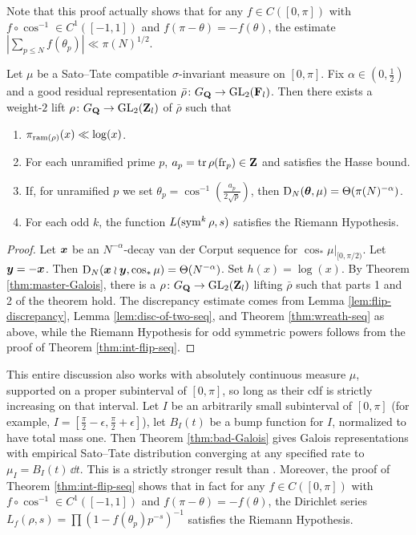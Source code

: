 Note that this proof actually shows that for any $f\in C([0,\pi])$ with 
$f\circ \cos^{-1}\in C^1([-1,1])$ and $f(\pi-\theta) = -f(\theta)$, the 
estimate $\left| \sum_{p\leqslant N} f(\theta_p)\right| \ll \pi(N)^{1/2}$. 

\begin{theorem}\label{thm:bad-Galois}
Let $\mu$ be a Sato--Tate compatible $\sigma$-invariant measure on $[0,\pi]$. 
Fix $\alpha\in \left(0,\frac 1 2\right)$ and a good residual representation 
$\bar\rho\colon G_{\mathbf{Q}} \to \operatorname{GL}_2(\mathbf{F}_l)$. Then there exists a weight-$2$ lift 
$\rho\colon G_{\mathbf{Q}} \to \operatorname{GL}_2(\mathbf{Z}_l)$ of $\bar\rho$ such that 
\begin{enumerate}
\item
$\pi_{\mathrm{ram}(\rho)}(x) \ll \log(x)$. 

\item
For each unramified prime $p$, $a_p = \operatorname{tr}\rho(\mathrm{fr}_p)\in \mathbf{Z}$ and satisfies 
the Hasse bound. 

\item
If, for unramified $p$ we set 
$\theta_p = \cos^{-1}\left(\frac{a_p}{2\sqrt p}\right)$, then 
$\operatorname{D}_N({\boldsymbol\theta},\mu) = \Theta(\pi(N)^{-\alpha})$. 

\item
For each odd $k$, the function $L(\operatorname{sym}^k \rho,s)$ satisfies the Riemann 
Hypothesis. 
\end{enumerate}
\end{theorem}
\begin{proof}
Let ${\boldsymbol x}$ be an $N^{-\alpha}$-decay van der Corput sequence for 
$\cos_\ast \left.\mu\right|_{[0,\pi/2)}$. Let ${\boldsymbol y} = -{\boldsymbol x}$. Then 
$\operatorname{D}_N({\boldsymbol x}\wr{\boldsymbol y},\cos_\ast\mu) = \Theta(N^{-\alpha})$. Set $h(x) = \log(x)$. 
By Theorem \ref{thm:master-Galois}, there is a 
$\rho\colon G_{\mathbf{Q}} \to \operatorname{GL}_2(\mathbf{Z}_l)$ lifting $\bar\rho$ such that parts 
1 and 2 of the theorem hold. The discrepancy estimate comes from Lemma 
\ref{lem:flip-discrepancy}, Lemma \ref{lem:disc-of-two-seq}, and Theorem 
\ref{thm:wreath-seq} as above, while the Riemann Hypothesis for odd symmetric 
powers follows from the proof of Theorem \ref{thm:int-flip-seq}. 
\end{proof}

This entire discussion also works with absolutely continuous measure $\mu$, 
supported on a proper subinterval of $[0,\pi]$, so long as their cdf is 
strictly increasing on that interval. Let $I$ be an arbitrarily small 
subinterval of $[0,\pi]$ (for example, 
$I = \left[\frac \pi 2 - \epsilon,\frac \pi 2 + \epsilon\right]$), let $B_I(t)$ 
be a bump function for $I$, normalized to have total mass one. Then Theorem 
\ref{thm:bad-Galois} gives Galois representations with empirical Sato--Tate 
distribution converging at any specified rate to $\mu_I = B_I(t)\, \dd t$. This 
is a strictly stronger result than \cite[Th.~5.2]{pande-2011}. Moreover, the 
proof of Theorem \ref{thm:int-flip-seq} shows that in fact for any 
$f\in C([0,\pi])$ with $f\circ \cos^{-1}\in C^1([-1,1])$ and 
$f(\pi-\theta) = -f(\theta)$, the Dirichlet series 
$L_f(\rho,s) = \prod \left( 1 - f(\theta_p) p^{-s}\right)^{-1}$ satisfies the 
Riemann Hypothesis. 
